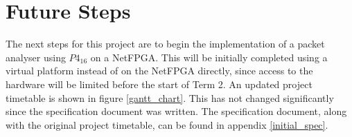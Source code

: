 \documentclass[12pt, a4paper, twoside, onecolumn]{article}
\begin{document}
\section{Future Steps}
The next steps for this project are to begin the implementation of a packet analyser using $P4_{16}$ on a NetFPGA. This will be initially completed using a virtual platform instead of on the NetFPGA directly, since access to the hardware will be limited before the start of Term 2. An updated project timetable is shown in figure \ref{gantt_chart}. This has not changed significantly since the specification document was written. The specification document, along with the original project timetable, can be found in appendix \ref{initial_spec}.

\end{document}
